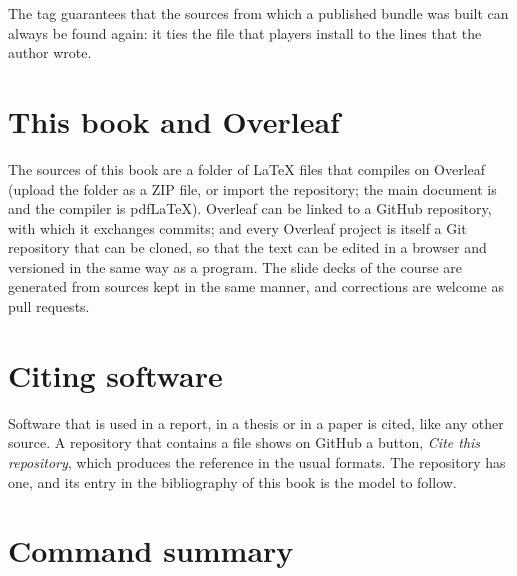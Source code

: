 The tag guarantees that the sources from which a published bundle was built
can always be found again: it ties the file that players install to the lines
that the author wrote.

\section{This book and Overleaf}

The sources of this book are a folder of \LaTeX{} files that compiles on
Overleaf (upload the folder as a ZIP file, or import the repository; the main
document is  and the compiler is pdf\LaTeX). Overleaf can be
linked to a GitHub repository, with which it exchanges commits; and every
Overleaf project is itself a Git repository that can be cloned, so that the
text can be edited in a browser and versioned in the same way as a program.
The slide decks of the course are generated from sources kept in the same
manner, and corrections are welcome as pull requests.

\section{Citing software}

Software that is used in a report, in a thesis or in a paper is cited, like
any other source. A repository that contains a file 
shows on GitHub a button, \emph{Cite this repository}, which produces the
reference in the usual formats. The \prg repository has one, and its entry
in the bibliography of this book \citep{prg32repo} is the model to follow.

\section{Command summary}

